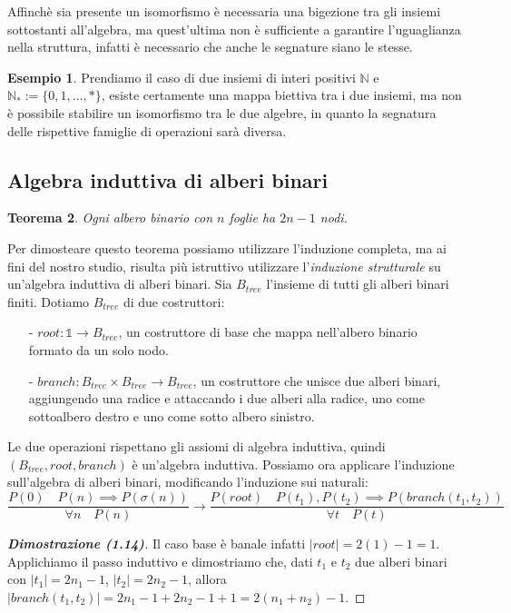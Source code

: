 \documentclass{article}
\newtheorem{theorem}{Teorema}[section]
\theoremstyle{definition}
\theoremstyle{definition}
\theoremstyle{definition}
\newtheorem{example}[theorem]{Esempio}
\theoremstyle{remark}
\begin{document}
Affinchè sia presente un isomorfismo è necessaria una bigezione tra gli insiemi sottostanti all'algebra, ma quest'ultima non è sufficiente a garantire l'uguaglianza nella struttura, infatti
è necessario che anche le segnature siano le stesse.
\begin{example} Prendiamo il caso di due insiemi di interi positivi $\mathbb{N}$ e $\mathbb{N}_*:=\{0,1,\dots,*\}$, esiste certamente una mappa biettiva tra i due insiemi, ma non è possibile stabilire un isomorfismo tra le due algebre, in quanto la segnatura delle rispettive
    famiglie di operazioni sarà diversa.
\end{example}
\subsection{Algebra induttiva di alberi binari}
\begin{theorem}
    Ogni albero binario con $n$ foglie ha $2n-1$ nodi.
\end{theorem}

Per dimosteare questo teorema possiamo utilizzare l'induzione completa, ma ai fini del nostro studio, risulta più istruttivo utilizzare l'\textit{induzione strutturale} su un'algebra induttiva di alberi binari.
Sia $B_{tree}$ l'insieme di tutti gli alberi binari finiti. Dotiamo $B_{tree}$ di due costruttori:
\begin{itemize}
    \item [-] $root : \mathds{1}\to B_{tree}$, un costruttore di base che mappa nell'albero binario formato da un solo nodo.
    \item [-] $branch: B_{tree}\times B_{tree} \to B_{tree}$, un costruttore che unisce due alberi binari, aggiungendo una radice e attaccando i due alberi alla radice, uno come sottoalbero destro e uno come sotto albero sinistro.
\end{itemize}
Le due operazioni rispettano gli assiomi di algebra
induttiva, quindi \\$(B_{tree},root,branch)$ è un'algebra induttiva.
Possiamo ora applicare l'induzione sull'algebra di alberi binari, modificando l'induzione sui naturali:
$$ \frac{P(0)\quad P(n)\implies P(\sigma(n))}{\forall n\quad P(n)}\to \frac{P(root)\quad P(t_1),P(t_2)\implies P(branch(t_1,t_2))}{\forall t \quad P(t)}$$

\begin{proof}[\textbf{Dimostrazione (1.14)}]Il caso base è banale infatti $|root| = 2(1)-1 = 1$. Applichiamo il passo induttivo e dimostriamo che, dati
    $t_1$ e $t_2$ due alberi binari con $|t_1| =2n_1-1$, $|t_2| = 2n_2-1$,  allora $|branch(t_1,t_2)| = 2n_1-1 + 2n_2 -1 +1 = 2(n_1+n_2)-1$.
\end{proof}
\end{document}
